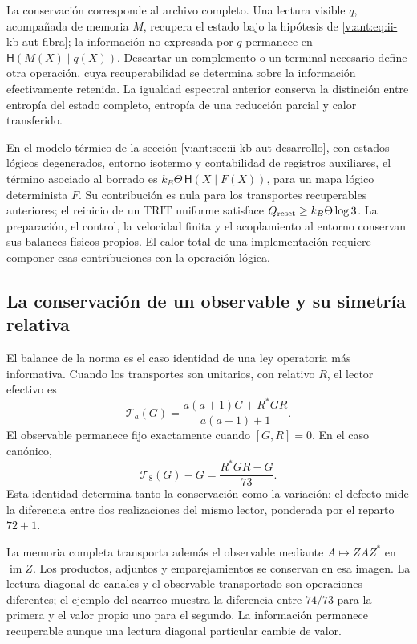 La conservación corresponde al archivo completo. Una lectura visible
\(q\), acompañada de memoria \(M\), recupera el estado bajo la
hipótesis de \eqref{v:ant:eq:ii-kb-aut-fibra}; la información no
expresada por \(q\) permanece en
\(\mathsf H(M(X)\mid q(X))\). Descartar un complemento o un
terminal necesario define otra operación, cuya recuperabilidad se
determina sobre la información efectivamente retenida. La igualdad
espectral anterior conserva la distinción entre entropía del estado
completo, entropía de una reducción parcial y calor transferido.

En el modelo térmico de la sección
\ref{v:ant:sec:ii-kb-aut-desarrollo}, con estados lógicos degenerados,
entorno isotermo y contabilidad de registros auxiliares, el término
asociado al borrado es
\(k_B\Theta\,\mathsf H(X\mid F(X))\), para un mapa lógico
determinista \(F\). Su contribución es nula para los transportes
recuperables anteriores; el reinicio de un TRIT uniforme satisface
\(Q_{\rm reset}\geq k_B\Theta\log3\). La preparación, el control,
la velocidad finita y el acoplamiento al entorno conservan sus
balances físicos propios. El calor total de una implementación
requiere componer esas contribuciones con la operación lógica.

\subsection{La conservación de un observable y su simetría relativa}
\label{lib06:simetria}

El balance de la norma es el caso identidad de una ley operatoria
más informativa. Cuando los transportes son unitarios, con relativo
\(R\), el lector efectivo es
\begin{equation}
 \mathcal T_a(G)=\frac{a(a+1)G+R^*GR}{a(a+1)+1}.
 \label{lib06:lector}
\end{equation}
El observable permanece fijo exactamente cuando \([G,R]=0\).
En el caso canónico,
\begin{equation}
 \mathcal T_8(G)-G=\frac{R^*GR-G}{73}.
 \label{lib06:defecto-lector}
\end{equation}
Esta identidad determina tanto la conservación como la variación:
el defecto mide la diferencia entre dos realizaciones del mismo
lector, ponderada por el reparto \(72+1\).

La memoria completa transporta además el observable mediante
\(A\mapsto ZAZ^*\) en \(\operatorname{im}Z\). Los productos,
adjuntos y emparejamientos se conservan en esa imagen. La lectura
diagonal de canales y el observable transportado son operaciones
diferentes; el ejemplo del acarreo muestra la diferencia entre
\(74/73\) para la primera y el valor propio uno para el segundo.
La información permanece recuperable aunque una lectura diagonal
particular cambie de valor.

